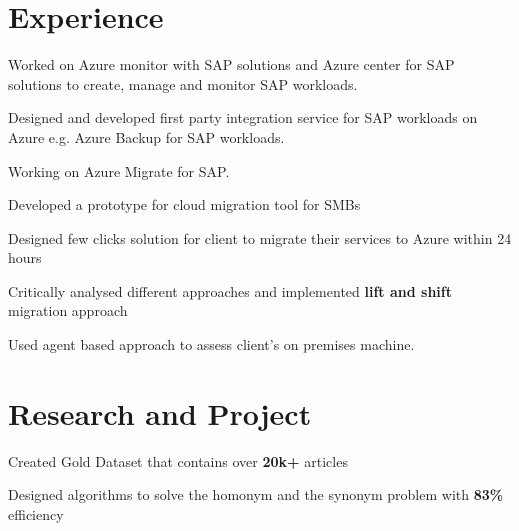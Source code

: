 \documentclass[a4paper]{deedy-resume-openfont}
\begin{document}
\hfill
\begin{minipage}[t]{0.63\textwidth} 

\section{Experience}
\vspace{\topsep}
\begin{tightemize}
\item Worked on Azure monitor with SAP solutions and Azure center for SAP solutions to create, manage and monitor SAP workloads.
\item Designed and developed first party integration service for SAP workloads on Azure e.g. Azure Backup for SAP workloads.
\item Working on Azure Migrate for SAP.
\end{tightemize}

\vspace{\topsep}
\begin{tightemize}
\item Developed a prototype for cloud migration tool for SMBs
\item Designed few clicks solution for client to migrate their services to Azure within 24 hours
\item Critically analysed different approaches and implemented \textbf{lift and shift} migration approach
\item Used agent based approach to assess client's on premises machine.
\end{tightemize}

\section{Research and Project}

\begin{tightemize}
\item Created Gold Dataset that contains over \textbf{20k+} articles
\item Designed algorithms to solve the homonym and the synonym problem with \textbf{83\%} efficiency
\end{tightemize}
\sectionsep


\end{minipage}
\end{document}
